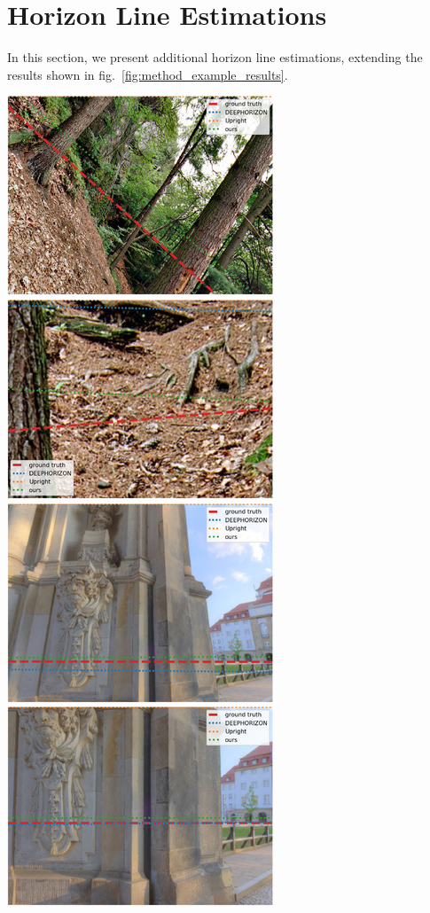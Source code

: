 \hypertarget{horizon-line-estimations}{%
\section{Horizon Line Estimations}\label{horizon-line-estimations}}

In this section, we present additional horizon line estimations,
extending the results shown in fig.~\ref{fig:method_example_results}.

\includegraphics{horizon_estimation/thumb/pano_addiryhuippofz-1.jpg}
\includegraphics{horizon_estimation/thumb/pano_addiryhuippofz-4.jpg}
\includegraphics{horizon_estimation/thumb/pano_additeyvjdqubv-0.jpg}
\includegraphics{horizon_estimation/thumb/pano_additeyvjdqubv-1.jpg}
